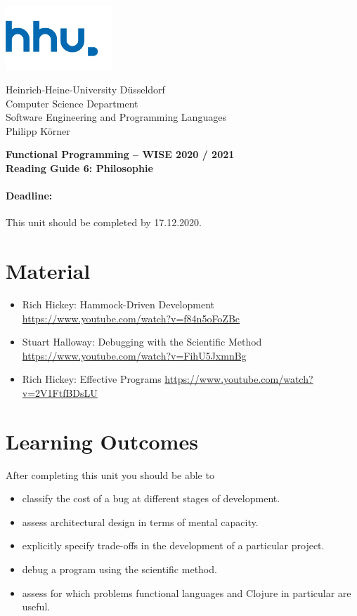 \documentclass[11pt,a4paper]{article}
\begin{document}
\begin{minipage}[b]{\textwidth}
	\parbox[t]{5cm}{%
		\includegraphics[width=4cm]{unilogo}
		\hfill
	}
	\parbox[b]{11cm}{%
		Heinrich-Heine-University D\"usseldorf\\
		Computer Science Department\\
		Software Engineering and Programming Languages\\
		Philipp K\"orner
	}
\end{minipage}
\begin{center}
	\bf
	Functional Programming -- WISE 2020 / 2021\\
	Reading Guide 6: Philosophie
\end{center}

\pagestyle{empty}

\paragraph{Deadline:} This unit should be completed by 17.12.2020.

\section{Material} 

\begin{itemize}
\item Rich Hickey: Hammock-Driven Development \url{https://www.youtube.com/watch?v=f84n5oFoZBc}
\item Stuart Halloway: Debugging with the Scientific Method \url{https://www.youtube.com/watch?v=FihU5JxmnBg}
\item Rich Hickey: Effective Programs \url{https://www.youtube.com/watch?v=2V1FtfBDsLU}
\end{itemize}


\section{Learning Outcomes}

After completing this unit you should be able to

\begin{itemize}
    \item classify the cost of a bug at different stages of development.
    \item assess architectural design in terms of mental capacity.
    \item explicitly specify trade-offs in the development of a particular project.
    \item debug a program using the scientific method.
    \item assess for which problems functional languages and Clojure in particular are useful.
\end{itemize}
\end{document}
